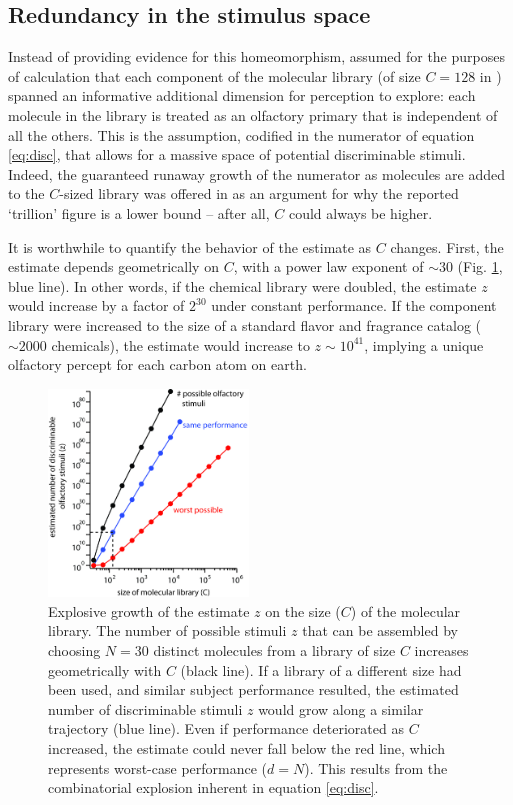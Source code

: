 \documentclass[letterpaper,twocolumn,10pt]{article}
\begin{document}
\subsection{Redundancy in the stimulus space}
Instead of providing evidence for this homeomorphism, \cite{bushdid_humans_2014} assumed for the purposes of calculation that each component of the molecular library 
(of size $C=128$ in \cite{bushdid_humans_2014}) 
spanned an informative additional dimension for perception to explore: 
each molecule in the library is treated as an olfactory primary that is independent of all the others. 
This is the assumption, codified in the numerator of equation \ref{eq:disc}, 
that allows for a massive space of potential discriminable stimuli. 
Indeed, the guaranteed runaway growth of the numerator as molecules are added to the $C$-sized library was offered in  \cite{bushdid_humans_2014} as an argument for why the reported `trillion' figure is a lower bound -- after all, $C$ could always be higher. 

It is worthwhile to quantify the behavior of the estimate as $C$ changes. 
First, the estimate depends geometrically on $C$, 
with a power law exponent of $\sim 30$ (Fig. \ref{fig:z_vs_C}, blue line). 
In other words, if the chemical library were doubled, 
the estimate $z$ would increase by a factor of $2^{30}$ under constant performance. 
If the component library were increased to the size of a standard flavor and fragrance catalog ($\sim2000$ chemicals), 
the estimate would increase to $z\sim10^{41}$, 
implying a unique olfactory percept for each carbon atom on earth. 

\begin{figure}[!hbt]
    \centering
    \includegraphics[width=0.475\textwidth]{figures/Fig9_C}
    \caption{
Explosive growth of the estimate $z$ on the size ($C$) of the molecular library.  The number of possible stimuli $z$ that can be assembled by choosing $N=30$ distinct molecules from a library of size $C$ increases geometrically with $C$ (black line).  If a library of a different size had been used, and similar subject performance resulted, the estimated number of discriminable stimuli $z$ would grow along a similar trajectory (blue line).  Even if performance deteriorated as $C$ increased, the estimate could never fall below the red line, which represents worst-case performance ($d=N$). This results from the combinatorial explosion inherent in equation \ref{eq:disc}.}
    \label{fig:z_vs_C}
\end{figure} 
\end{document}
